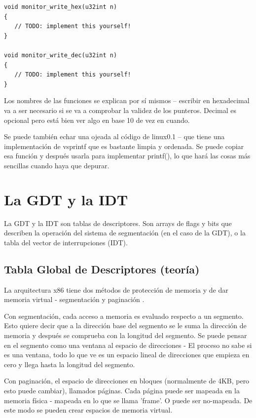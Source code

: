 \documentclass{report}
\begin{document}
\begin{lstlisting}
void monitor_write_hex(u32int n)
{
   // TODO: implement this yourself!
}

void monitor_write_dec(u32int n)
{
   // TODO: implement this yourself!
}
\end{lstlisting}

Los nombres de las funciones se explican por s\'{i} mismos – escribir en hexadecimal va a ser necesario si se va a comprobar la validez de los punteros. Decimal es opcional pero est\'{a} bien ver algo en base 10 de vez en cuando.

Se puede tambi\'{e}n echar una ojeada al c\'{o}digo de linux0.1 – que tiene una implementaci\'{o}n de vsprintf que es bastante limpia y ordenada. Se puede copiar esa funci\'{o}n y despu\'{e}s usarla para implementar printf(), lo que har\'{a} las cosas m\'{a}s sencillas cuando haya que depurar.

\chapter{La GDT y la IDT}

La GDT y la IDT son tablas de descriptores. Son arrays de flags y bits que describen la operaci\'{o}n del sistema de segmentaci\'{o}n (en el caso de la GDT), o la tabla del vector de interrupciones (IDT).


\section{Tabla Global de Descriptores (teor\'{i}a)}

La arquitectura x86 tiene dos m\'{e}todos de protecci\'{o}n de memoria y de dar memoria virtual - segmentaci\'{o}n y paginaci\'{o}n .

Con segmentaci\'{o}n, cada acceso a memoria es evaluado respecto a un segmento. Esto quiere decir que a la direcci\'{o}n base del segmento se le suma la direcci\'{o}n de memoria y despu\'{e}s se comprueba con la longitud del segmento. Se puede pensar en el segmento como una ventana al espacio de direcciones - El proceso no sabe si es una ventana, todo lo que ve es un espacio lineal de direcciones que empieza en cero y llega hasta la longitud del segmento.

Con paginaci\'{o}n, el espacio de direcciones en bloques (normalmente de 4KB, pero esto puede cambiar), llamados p\'{a}ginas. Cada p\'{a}gina puede ser mapeada en la memoria f\'{i}sica - mapeada en lo que se llama 'frame'. O puede ser no-mapeada. De este modo se pueden crear espacios de memoria virtual.
\end{document}
